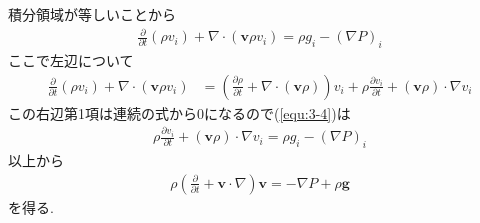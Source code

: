 \documentclass[uplatex,a4j,11pt,dvipdfmx]{jsarticle}
\begin{document}
積分領域が等しいことから
\begin{align}
  \label{equ:3-4}
  \frac{\partial}{\partial t}(\rho v_i)+\nabla\cdot({\bm v}\rho v_i)=\rho g_i-(\nabla P)_i
\end{align}
ここで左辺について
\begin{align}
  \frac{\partial}{\partial t}(\rho v_i)+\nabla\cdot({\bm v}\rho v_i)&=
  \left(\frac{\partial \rho}{\partial t}+\nabla\cdot({\bm v}\rho)\right)v_i+\rho\frac{\partial v_i}{\partial t}+({\bm v}\rho)\cdot\nabla v_i
\end{align}
この右辺第1項は連続の式から0になるので(\ref{equ:3-4})は
\begin{align}
  \rho\frac{\partial v_i}{\partial t}+({\bm v}\rho)\cdot\nabla v_i=\rho g_i-(\nabla P)_i
\end{align}
以上から
\begin{align}
  \rho\left(\frac{\partial}{\partial t}+{\bm v}\cdot\nabla\right){\bm v}=-\nabla P+\rho{\bm g}
\end{align}
を得る.
\end{document}
